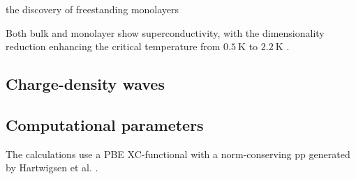 \documentclass[main.tex]{subfiles}
\begin{document}
the discovery of freestanding monolayers \cite{novoselov_two-dimensional_2005}

Both bulk and monolayer \TaS show superconductivity, with the dimensionality reduction enhancing the critical temperature from \(\SI{0.5}{\kelvin}\) to \(\SI{2.2}{\kelvin}\) \cite{navarro-moratalla_enhanced_2016}.

\subsection{Charge-density waves}



\subsection{Computational parameters}

The calculations use a PBE XC-functional with a norm-conserving \acrshort{pp} generated by Hartwigsen et al. \cite{hartwigsen_relativistic_1998}.
\end{document}
